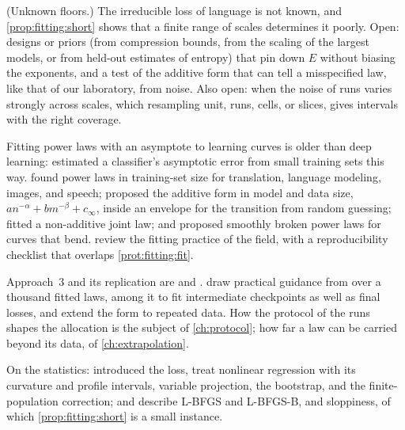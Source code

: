 \begin{refsection}
\begin{exercises}
\item \research (Unknown floors.) The irreducible loss of language is not known, and \cref{prop:fitting:short} shows that a finite range of scales determines it poorly. Open: designs or priors (from compression bounds, from the scaling of the largest models, or from held-out estimates of entropy) that pin down $E$ without biasing the exponents, and a test of the additive form that can tell a misspecified law, like that of our laboratory, from noise. Also open: when the noise of runs varies strongly across scales, which resampling unit, runs, cells, or slices, gives intervals with the right coverage.\label{ex:fitting:research}
\end{exercises}

\notesandrefs
Fitting power laws with an asymptote to learning curves is older than deep learning: \textcite{CortesEtAl1993} estimated a classifier's asymptotic error from small training sets this way. \Textcite{HestnessEtAl2017} found power laws in training-set size for translation, language modeling, images, and speech; \textcite{RosenfeldEtAl2020} proposed the additive form in model and data size, $an^{-\alpha}+bm^{-\beta}+c_\infty$, inside an envelope for the transition from random guessing; \textcite{KaplanEtAl2020} fitted a non-additive joint law; and \textcite{CaballeroEtAl2023} proposed smoothly broken power laws for curves that bend. \Textcite{LiEtAl2025} review the fitting practice of the field, with a reproducibility checklist that overlaps \cref{prot:fitting:fit}.

Approach~3 and its replication are \textcite{HoffmannEtAl2022} and \textcite{BesirogluEtAl2024}. \Textcite{ChoshenEtAl2025} draw practical guidance from over a thousand fitted laws, among it to fit intermediate checkpoints as well as final losses, and \textcite{MuennighoffEtAl2023} extend the form to repeated data. How the protocol of the runs shapes the allocation is the subject of \cref{ch:protocol}; how far a law can be carried beyond its data, of \cref{ch:extrapolation}.

On the statistics: \textcite{Huber1964} introduced the loss, \textcite{BatesWatts1988} treat nonlinear regression with its curvature and profile intervals, \textcite{GolubPereyra1973} variable projection, \textcite{EfronTibshirani1993} the bootstrap, and \textcite{Cochran1977} the finite-population correction; \textcite{Nocedal1980} and \textcite{ByrdEtAl1995} describe L-BFGS and L-BFGS-B, and \textcite{GutenkunstEtAl2007} sloppiness, of which \cref{prop:fitting:short} is a small instance.


\end{refsection}
